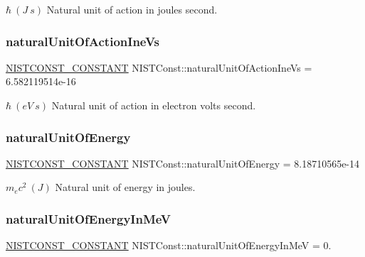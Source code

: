 $\hbar \ (J\ s)$ Natural unit of action in joules second. \mbox{\label{group___n_i_s_t_const-_natural_unit_gadf0b7bf18e0371c6528e8532ae1b9984}} 
\subsubsection{\texorpdfstring{natural\+Unit\+Of\+Action\+Ine\+Vs}{naturalUnitOfActionIneVs}}
{\footnotesize\ttfamily \mbox{\hyperlink{group___n_i_s_t_const-_macros_ga2b0fc1d7452373f816175dd86ce26729}{N\+I\+S\+T\+C\+O\+N\+S\+T\+\_\+\+C\+O\+N\+S\+T\+A\+NT}} N\+I\+S\+T\+Const\+::natural\+Unit\+Of\+Action\+Ine\+Vs = 6.\+582119514e-\/16}

$\hbar \ (eV\ s)$ Natural unit of action in electron volts second. \mbox{\label{group___n_i_s_t_const-_natural_unit_gafbdfe6f0b94bdc194fcb719c7a09ad01}} 
\subsubsection{\texorpdfstring{natural\+Unit\+Of\+Energy}{naturalUnitOfEnergy}}
{\footnotesize\ttfamily \mbox{\hyperlink{group___n_i_s_t_const-_macros_ga2b0fc1d7452373f816175dd86ce26729}{N\+I\+S\+T\+C\+O\+N\+S\+T\+\_\+\+C\+O\+N\+S\+T\+A\+NT}} N\+I\+S\+T\+Const\+::natural\+Unit\+Of\+Energy = 8.\+18710565e-\/14}

$m_e c^2 \ (J)$ Natural unit of energy in joules. \mbox{\label{group___n_i_s_t_const-_natural_unit_gae7af288f55f49ca09dae5a25f69941c6}} 
\subsubsection{\texorpdfstring{natural\+Unit\+Of\+Energy\+In\+MeV}{naturalUnitOfEnergyInMeV}}
{\footnotesize\ttfamily \mbox{\hyperlink{group___n_i_s_t_const-_macros_ga2b0fc1d7452373f816175dd86ce26729}{N\+I\+S\+T\+C\+O\+N\+S\+T\+\_\+\+C\+O\+N\+S\+T\+A\+NT}} N\+I\+S\+T\+Const\+::natural\+Unit\+Of\+Energy\+In\+MeV = 0.}

